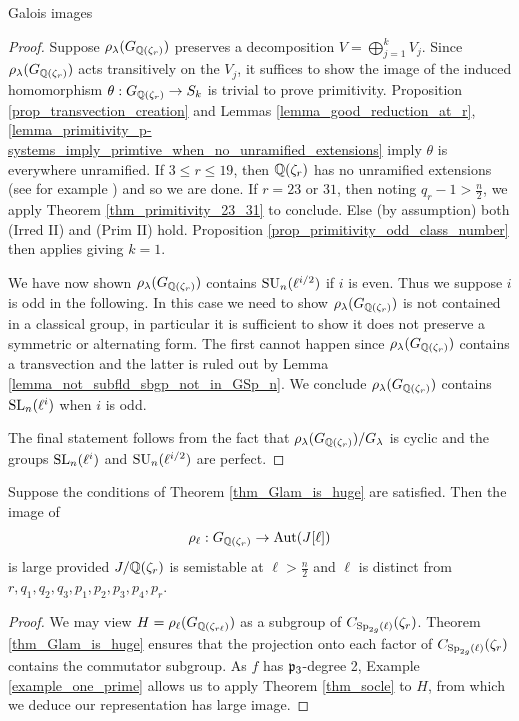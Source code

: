\documentclass[11pt,a4paper]{article}
\newcommand{\Qr}{{\QQ(\zeta_r)}}
\newcommand{\GQr}{G_{\QQ(\zeta_{r})}}
\newcommand{\GQrl}{G_{\QQ(\zeta_{r\ell})}}
\newcommand{\zr}{\zeta_r}
\newcommand{\Glam}{G_{\lambda}}
\begin{document}
\begin{section}{Galois images}
\begin{proof}
Suppose $\rho_\lambda(\GQr)$ preserves a decomposition $V=\bigoplus_{j=1}^k V_j$.
Since $\rho_\lambda(\GQr)$ acts transitively on the $V_j$, it suffices to show the image of the induced homomorphism $\theta:\GQr \rightarrow S_k $ is trivial to prove primitivity.
Proposition \ref{prop_transvection_creation} and Lemmas \ref{lemma_good_reduction_at_r}, \ref{lemma_primitivity_p-systems_imply_primtive_when_no_unramified_extensions} imply $\theta$ is everywhere unramified.
If $3 \leq r \leq 19$, then $\Qr$ has no unramified extensions (see for example \cite[Appendix]{Yamamura_imaginary_abelian_NF_with_class_numbe_one}) and so we are done.
If $r=23$ or $31$, then noting $q_r -1 > \frac{n}{2}$, we apply Theorem \ref{thm_primitivity_23_31} to conclude.
Else (by assumption) both (Irred II) and (Prim II) hold. Proposition \ref{prop_primitivity_odd_class_number} then applies giving $k=1$.


We have now shown $\rho_\lambda(\GQr)$ contains $\SU_n(\ell^{i/2})$ if $i$ is even. Thus we suppose $i$ is odd in the following.
In this case we need to show $\rho_\lambda(\GQr)$ is not contained in a classical group, in particular it is sufficient to show it does not preserve a symmetric or alternating form.
The first cannot happen since $\rho_\lambda(\GQr)$ contains a transvection \cite[Prop. 5.7]{Grove} and the latter is ruled out by Lemma \ref{lemma_not_subfld_sbgp_not_in_GSp_n}. We conclude $\rho_\lambda(\GQr)$ contains $\SL_n(\ell^{i})$ when $i$ is odd.

The final statement follows from the fact that $\rho_\lambda(\GQr)/\Glam$ is cyclic and the groups $\SL_n(\ell^i)$ and $\SU_n(\ell^{i/2})$ are perfect.
\end{proof}


\begin{theorem}
\label{thm_mod_l_image_is_huge}
Suppose the conditions of Theorem \ref{thm_Glam_is_huge} are satisfied.
Then the image of  \[\rho_\ell:\GQr \rightarrow \Aut(J[\ell])\] is large provided  $J/\Qr$ is semistable at $\ell> \frac{n}{2}$ and $\ell$ is distinct from $r,q_1,q_2,q_3,p_1,p_2,p_3,p_4,p_r$.
\end{theorem}

\begin{proof}
We may view $H = \rho_\ell(\GQrl)$ as a subgroup of $C_{\Sp_{2g}(\ell)}(\zr)$.
Theorem \ref{thm_Glam_is_huge} ensures that the projection onto each factor of $C_{\Sp_{2g}(\ell)}(\zr)$ contains the commutator subgroup.
As $f$ has $\mathfrak{p}_3$-degree 2, Example \ref{example_one_prime} allows us to apply Theorem \ref{thm_socle} to $H$, from which we deduce our representation has large image.
\end{proof}



\end{section}
\end{document}
